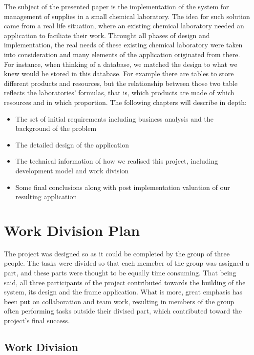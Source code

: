 \documentclass[a4paper,11pt,twoside]{report}
\theoremstyle{definition}
\begin{document}
The subject of the presented paper is the implementation of the system for management of supplies in a small chemical laboratory. The idea for such solution came from a real life situation, where an existing chemical laboratory needed an application to faciliate their work. Throught all phases of design and implementation, the real needs of these existing chemical laboratory were taken into consideration and many elements of the application originated from there. 
For instance, when thinking of a database, we matched the design to what we knew would be stored in this database. For example there are tables to store different products and resources, but the relationship between those two table reflects the laboratories' formulas, that is, which products are made of which resources and in which proportion. 
The following chapters will describe in depth:
\begin{itemize}
\item The set of initial requirements including business analysis and the background of the problem
\item The detailed design of the application
\item The technical information of how we realised this project, including development model and work division
\item Some final conclusions along with post implementation valuation of our resulting application
\end{itemize}




\chapter{Work Division Plan}

The project was designed so as it could be completed by the group of three people. The tasks were divided so that each memeber of the group was assigned a part, and these parts were thought to be equally time consuming. That being said, all three participants of the project contributed towards the building of the system, its design and the frame application. What is more, great emphasis has been put on collaboration and team work, resulting in members of the group often performing tasks outside their divised part, which contributed toward the project's final success.

\section{Work Division}
\end{document}
